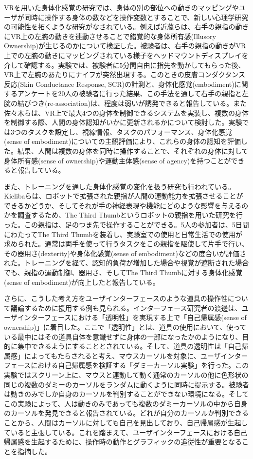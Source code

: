 VRを用いた身体化感覚の研究では、身体の別の部位への動きのマッピングやユーザが同時に操作する身体の数などを操作変数とすることで、新しい心理学研究の可能性を拓くような研究がなされている。例えば近藤ら\cite{Kondo2020}は、右手の親指の動きにVR上の左腕の動きを連動させることで錯覚的な身体所有感(Illusory Ownership)が生じるのかについて検証した。被験者は、右手の親指の動きがVR上での左腕の動きにマッピングされている様子をヘッドマウントディスプレイを介して確認する。実験では、被験者に5分間自由に指先を動かしてもらった後、VR上で左腕のあたりにナイフが突然出現する。このときの皮膚コンダクタンス反応(Skin Conductance Response, SCR)の計測と、身体化感覚(embodiment)に関するアンケートを20人の被験者に行った結果、この手法を通して右手の親指と左腕の結びつき(re-association)は、程度は弱いが誘発できると報告している。また佐々木ら\cite{sasaki2022multisoma}は、VR上で最大4つの身体を制御できるシステムを実装し、複数の身体を制御する際、人間の身体認知がいかに更新されるかについて検討した。実験では3つのタスクを設定し、視線情報、タスクのパフォーマンス、身体化感覚(sense of embodiment)についての主観評価により、これらの身体の認知を評価した。結果、人間は複数の身体を同時に操作することで、それぞれの身体に対して身体所有感(sense of ownership)や運動主体感(sense of agency)を持つことができると報告している。

また、トレーニングを通した身体化感覚の変化を扱う研究も行われている。Kielibaら\cite{kieliba2021robotic}は、ロボットで拡張された親指が人間の運動能力を拡張させることができるかどうか、そしてそれが手の神経表現や機能にどのような影響を与えるのかを調査するため、The Third Thumbというロボットの親指を用いた研究を行った。この親指は、足のつま先で操作することができる。5人の参加者は、5日間にわたってThe Third Thumbを装着し、実験室での使用と日常生活での使用が求められた。通常は両手を使って行うタスクをこの親指を駆使して片手で行い、その器用さ(dexterity)や身体化感覚(sense of embodiment)などの度合いが評価された。トレーニングを経て、認知的負荷が増加した場合や視覚が遮断された場合でも、親指の運動制御、器用さ、そしてThe Third Thumbに対する身体化感覚(sense of embodiment)が向上したと報告している。

さらに、こうした考え方をユーザインターフェースのような道具の操作性について議論するために援用する例も見られる。インターフェース研究者の渡邊は、ユーザインターフェースにおける「透明性」を実現する上で「自己帰属感(sense of ownership)」に着目した\cite{Watanabe2017}。ここで「透明性」とは、道具の使用において、使っている最中にはその道具自体を意識せずに身体の一部になったかのようになり、目的に集中できるようにすることとされている。そして、道具の透明性は「自己帰属感」によってもたらされると考え、マウスカーソルを対象に、ユーザインターフェースにおける自己帰属感を検証する「ダミーカーソル実験」を行った\cite{Watanabe2013}。この実験ではスクリーン上に、マウスと連動して動く通常のカーソルの他に色形状の同じの複数のダミーのカーソルをランダムに動くように同時に提示する。被験者は動きのみでしか自身のカーソルを判別することができない環境になる。そしてこの実験によって、人は動きのみであっても複数のダミーカーソルの中から自身のカーソルを発見できると報告されている。どれが自分のカーソルか判別できることから、人間はカーソルに対しても自己を見出しており、自己帰属感が生起していると主張している。これを踏まえて、ユーザインターフェースにおける自己帰属感を生起するために、操作時の動作とグラフィックの追従性が重要となることを指摘した。

